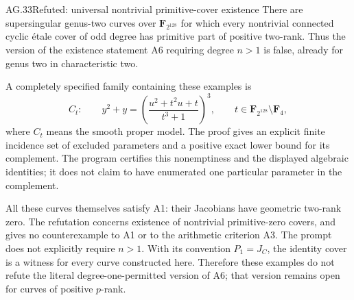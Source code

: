 \begin{claim}{AG.33}{Refuted: universal nontrivial primitive-cover existence}
\label{clm:AGprimitivecounterexample}
There are supersingular genus-two curves over
$\mathbf F_{2^{128}}$ for which every nontrivial connected
cyclic \'etale cover of odd degree has primitive part of
positive two-rank. Thus the version of the existence statement
A6 requiring degree $n>1$ is false, already for genus two
in characteristic two.

A completely specified family containing these examples is
\[
 C_t:\qquad y^2+y=
       \left(\frac{u^2+t^2u+t}{t^3+1}\right)^3,
 \qquad
 t\in\mathbf F_{2^{128}}\setminus\mathbf F_4,       \tag{AG.33.1}
\]
where $C_t$ means the smooth proper model. The proof gives
an explicit finite incidence set of excluded parameters
and a positive exact lower bound for its complement.
The program certifies this nonemptiness and the displayed
algebraic identities; it does not claim to have enumerated
one particular parameter in the complement.

All these curves themselves satisfy A1: their Jacobians
have geometric two-rank zero. The refutation concerns
existence of nontrivial primitive-zero covers, and gives no
counterexample to A1 or to the arithmetic criterion A3.
The prompt does not explicitly require $n>1$. With its
convention $P_1=J_C$, the identity cover is a witness for
every curve constructed here. Therefore these examples
do not refute the literal degree-one-permitted version
of A6; that version remains open for curves of positive
$p$-rank.
\end{claim}
